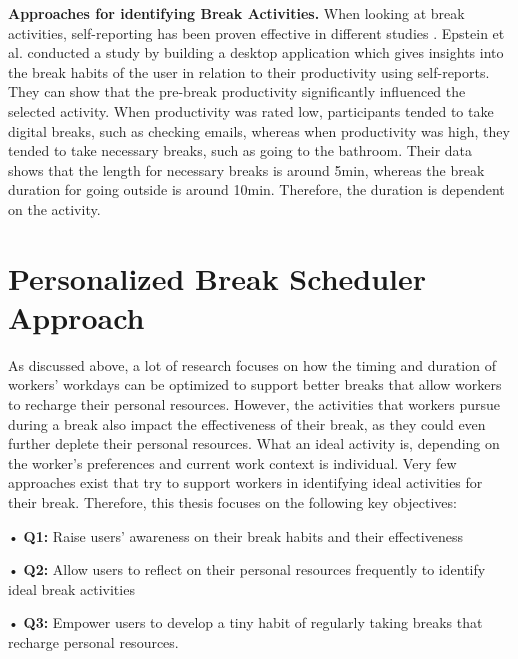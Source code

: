 \documentclass{hasel_thesis}
\begin{document}
\textbf{Approaches for identifying Break Activities.} When looking at break activities, self-reporting has been proven effective in different studies \cite{Bloom.2014, epstein.2016t}. Epstein et al. \cite{epstein.2016t} conducted a study by building a desktop application which gives insights into the break habits of the user in relation to their productivity using self-reports. They can show that the pre-break productivity significantly influenced the selected activity. When productivity was rated low, participants tended to take digital breaks, such as checking emails, whereas when productivity was high, they tended to take necessary breaks, such as going to the bathroom. Their data shows that the length for necessary breaks is around 5min, whereas the break duration for going outside is around 10min. Therefore, the duration is dependent on the activity.



\chapter{Personalized Break Scheduler Approach} \label{design_approach}



As discussed above, a lot of research focuses on how the timing and duration of workers' workdays can be optimized to support better breaks that allow workers to recharge their personal resources. However, the activities that workers pursue during a break also impact the effectiveness of their break, as they could even further deplete their personal resources. What an ideal activity is, depending on the worker's preferences and current work context is individual. Very few approaches exist that try to support workers in identifying ideal activities for their break. Therefore, this thesis focuses on the following key objectives:

\begin{tcolorbox}[colback=white!5!white,colframe=black!75!black]
• \textbf{Q1:} Raise users' awareness on their break habits and their effectiveness

• \textbf{Q2:} Allow users to reflect on their personal resources frequently to identify ideal break activities

• \textbf{Q3:} Empower users to develop a tiny habit of regularly taking breaks that recharge personal resources.
\end{tcolorbox}
\end{document}
